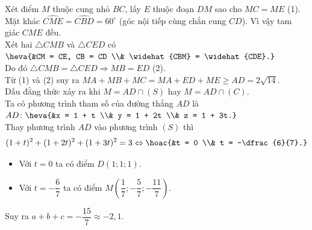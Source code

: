\begin{bt}
{{
		}  \noindent
		 Xét điểm $M$ thuộc cung nhỏ $BC$, lấy $E$ thuộc đoạn $DM$ sao cho $MC = ME$ (1).\\
		Mặt khác $\widehat{CME} = \widehat{CBD} = 60^{\circ}$ (góc nội tiếp cùng chắn cung $CD$). Vì vậy  tam giác $CME$ đều.\\
		Xét hai $\triangle CMB$ và $\triangle CED$ có $\heva{&CM = CE, CB = CD \\& \widehat{CBM} = \widehat{CDE}.}$\\ 
		Do  đó $\triangle CMB = \triangle CED \Rightarrow MB = ED$ (2).\\
		Từ (1) và  (2) suy ra $MA + MB + MC = MA + ED + ME \geq AD = 2\sqrt{14}$.\\
		Dấu đằng thức xảy  ra khi $M = AD \cap (S)$ hay $M = AD \cap (C)$.\\
		Ta có phương trình tham số của đường thẳng $AD$ là $AD \colon  \heva{&x = 1 + t \\& y = 1 + 2t \\& z = 1 + 3t.}$\\
		Thay phương trình $AD$ vào phương trình $(S)$ thì 
		$$(1  + t)^2 + (1 + 2 t)^2 + (1 + 3t)^2 = 3 \Leftrightarrow \hoac{&t = 0 \\& t = -\dfrac{6}{7}.}$$
		\begin{itemize}
			\item Với $t =  0$ ta có điểm $D(1; 1; 1)$.
			\item Với $t = -\dfrac{6}{7}$ ta có điểm $M  \left(\dfrac{1}{7}; -\dfrac{5}{7}; -\dfrac{11}{7}\right)$.
		\end{itemize}
		 Suy ra $a + b + c = -\dfrac{15}{7} \approx -2{,}1$.
	 }
\end{bt}

